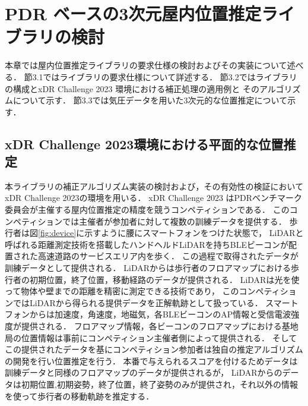 
\chapter{PDR ベースの3次元屋内位置推定ライブラリの検討}
\thispagestyle{myheadings}
本章では屋内位置推定ライブラリの要求仕様の検討およびその実装について述べる．
節3.1ではライブラリの要求仕様について詳述する．
節3.2ではライブラリの構成とxDR Challenge 2023 環境における補正処理の適用例と
そのアルゴリズムについて示す．
節3.3では気圧データを用いた3次元的な位置推定について示す．




\section{xDR Challenge 2023環境における平面的な位置推定}

本ライブラリの補正アルゴリズム実装の検討および，その有効性の検証においてxDR Challenge 2023\cite{xdr}の環境を用いる．
xDR Challenge 2023 はPDRベンチマーク委員会が主催する屋内位置推定の精度を競うコンペティションである．
このコンペティションでは主催者が参加者に対して複数の訓練データを提供する．
歩行者は図\ref{fig:device}に示すように腰にスマートフォンをつけた状態で，
LiDARと呼ばれる距離測定技術を搭載したハンドヘルドLiDARを持ちBLEビーコンが配置された高速道路のサービスエリア内を歩く．
この過程で取得されたデータが訓練データとして提供される．
LiDARからは歩行者のフロアマップにおける歩行者の初期位置，終了位置，移動経路のデータが提供される．
LiDARは光を使って物体や壁までの距離を精密に測定できる技術であり，
このコンペティションではLiDARから得られる提供データを正解軌跡として扱っている．
スマートフォンからは加速度，角速度，地磁気，各BLEビーコンのAP情報と受信電波強度が提供される．
フロアマップ情報，各ビーコンのフロアマップにおける基地局の位置情報は事前にコンペティション主催者側によって提供される．
そしてこの提供されたデータを基にコンペティション参加者は独自の推定アルゴリズムの開発を行い位置推定を行う．
本番で与えられるスコアを付けるためデータは訓練データと同様のフロアマップのデータが提供されるが，
LiDARからのデータは初期位置,初期姿勢，終了位置，終了姿勢のみが提供され，それ以外の情報を使って歩行者の移動軌跡を推定する．



